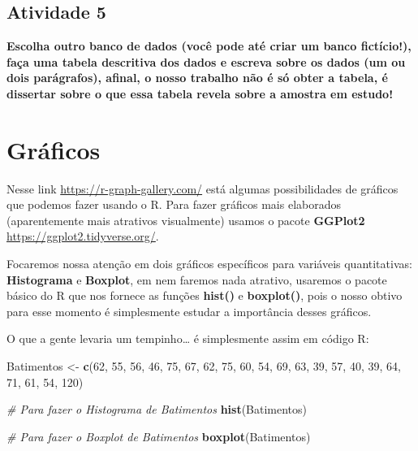 \documentclass[
]{book}
\newenvironment{Shaded}{\begin{snugshade}}{\end{snugshade}}
\newcommand{\CommentTok}[1]{\textcolor[rgb]{0.56,0.35,0.01}{\textit{#1}}}
\newcommand{\DecValTok}[1]{\textcolor[rgb]{0.00,0.00,0.81}{#1}}
\newcommand{\FunctionTok}[1]{\textcolor[rgb]{0.13,0.29,0.53}{\textbf{#1}}}
\newcommand{\NormalTok}[1]{#1}
\newcommand{\OtherTok}[1]{\textcolor[rgb]{0.56,0.35,0.01}{#1}}
\begin{document}
\section{Atividade 5}\label{atividade-5}

\textbf{Escolha outro banco de dados (você pode até criar um banco fictício!), faça uma tabela descritiva dos dados e escreva sobre os dados (um ou dois parágrafos), afinal, o nosso trabalho não é só obter a tabela, é dissertar sobre o que essa tabela revela sobre a amostra em estudo!}

\chapter{Gráficos}\label{gruxe1ficos}

Nesse link \url{https://r-graph-gallery.com/} está algumas possibilidades de gráficos que podemos fazer usando o R. Para fazer gráficos mais elaborados (aparentemente mais atrativos visualmente) usamos o pacote \textbf{GGPlot2} \url{https://ggplot2.tidyverse.org/}.

Focaremos nossa atenção em dois gráficos específicos para variáveis quantitativas: \textbf{Histograma} e \textbf{Boxplot}, em nem faremos nada atrativo, usaremos o pacote básico do R que nos fornece as funções \textbf{hist()} e \textbf{boxplot()}, pois o nosso obtivo para esse momento é simplesmente estudar a importância desses gráficos.

O que a gente levaria um tempinho\ldots{} é simplesmente assim em código R:

\begin{Shaded}
\begin{Highlighting}[]
\NormalTok{Batimentos }\OtherTok{\textless{}{-}} \FunctionTok{c}\NormalTok{(}\DecValTok{62}\NormalTok{, }\DecValTok{55}\NormalTok{, }\DecValTok{56}\NormalTok{, }\DecValTok{46}\NormalTok{, }\DecValTok{75}\NormalTok{, }\DecValTok{67}\NormalTok{, }\DecValTok{62}\NormalTok{, }\DecValTok{75}\NormalTok{, }\DecValTok{60}\NormalTok{, }\DecValTok{54}\NormalTok{, }\DecValTok{69}\NormalTok{, }\DecValTok{63}\NormalTok{, }\DecValTok{39}\NormalTok{, }\DecValTok{57}\NormalTok{, }\DecValTok{40}\NormalTok{, }\DecValTok{39}\NormalTok{, }\DecValTok{64}\NormalTok{, }\DecValTok{71}\NormalTok{, }\DecValTok{61}\NormalTok{, }\DecValTok{54}\NormalTok{, }\DecValTok{120}\NormalTok{)}

\CommentTok{\# Para fazer o Histograma de Batimentos}
\FunctionTok{hist}\NormalTok{(Batimentos)}

\CommentTok{\# Para fazer o Boxplot de Batimentos}
\FunctionTok{boxplot}\NormalTok{(Batimentos)}
\end{Highlighting}
\end{Shaded}
\end{document}

